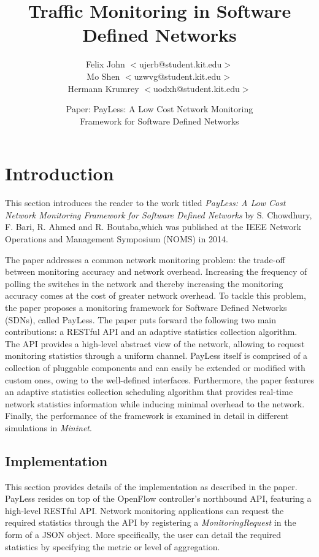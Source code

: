 \documentclass[DIV=12]{scrartcl}
\begin{document}
\title{Traffic Monitoring in Software Defined Networks}

\author{Felix John $<$ujerb@student.kit.edu$>$\\ Mo Shen $<$uzwvg@student.kit.edu$>$ \\ Hermann Krumrey $<$uodxh@student.kit.edu$>$}

\date{Paper: PayLess: A Low Cost Network Monitoring \\ Framework for Software Defined Networks}

\maketitle

\section{Introduction}
This section introduces the reader to the work titled \emph{PayLess: A Low Cost Network Monitoring Framework for Software Defined Networks} by S. Chowdhury, F. Bari, R. Ahmed and R. Boutaba,which was published at the IEEE Network Operations and Management Symposium (NOMS) in 2014.  

The paper addresses a common network monitoring problem: the trade-off between monitoring accuracy and network overhead. Increasing the frequency of polling the switches in the network and thereby increasing the monitoring accuracy comes at the cost of greater network overhead. To tackle this problem, the paper proposes a monitoring framework for Software Defined Networks (SDNs), called PayLess. The paper puts forward the following two main contributions: a RESTful API and an adaptive statistics collection algorithm. The API provides a high-level abstract view of the network, allowing to request monitoring statistics through a uniform channel. PayLess itself is comprised of a collection of pluggable components and can easily be extended or modified with custom ones, owing to the well-defined interfaces. Furthermore, the paper features an adaptive statistics collection scheduling algorithm that provides real-time network statistics information while inducing minimal overhead to the network. Finally, the performance of the framework is examined in detail in different simulations in \textit{Mininet}.

\subsection{Implementation}
This section provides details of the implementation as described in the paper. PayLess resides on top of the OpenFlow controller's northbound API, featuring a high-level RESTful API. Network monitoring applications can request the required statistics through the API by registering a \textit{MonitoringRequest} in the form of a JSON object. More specifically, the user can detail the required statistics by specifying the metric or level of aggregation. 
\end{document}
